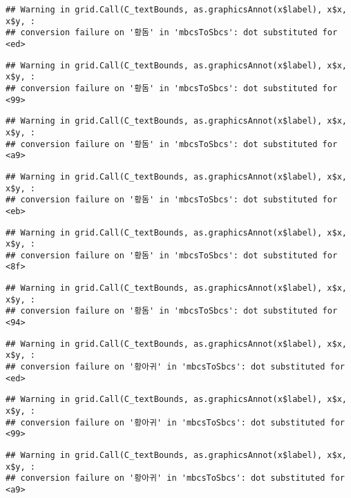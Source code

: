 \documentclass[
]{article}
\begin{document}
\begin{verbatim}
## Warning in grid.Call(C_textBounds, as.graphicsAnnot(x$label), x$x, x$y, :
## conversion failure on '황돔' in 'mbcsToSbcs': dot substituted for <ed>
\end{verbatim}

\begin{verbatim}
## Warning in grid.Call(C_textBounds, as.graphicsAnnot(x$label), x$x, x$y, :
## conversion failure on '황돔' in 'mbcsToSbcs': dot substituted for <99>
\end{verbatim}

\begin{verbatim}
## Warning in grid.Call(C_textBounds, as.graphicsAnnot(x$label), x$x, x$y, :
## conversion failure on '황돔' in 'mbcsToSbcs': dot substituted for <a9>
\end{verbatim}

\begin{verbatim}
## Warning in grid.Call(C_textBounds, as.graphicsAnnot(x$label), x$x, x$y, :
## conversion failure on '황돔' in 'mbcsToSbcs': dot substituted for <eb>
\end{verbatim}

\begin{verbatim}
## Warning in grid.Call(C_textBounds, as.graphicsAnnot(x$label), x$x, x$y, :
## conversion failure on '황돔' in 'mbcsToSbcs': dot substituted for <8f>
\end{verbatim}

\begin{verbatim}
## Warning in grid.Call(C_textBounds, as.graphicsAnnot(x$label), x$x, x$y, :
## conversion failure on '황돔' in 'mbcsToSbcs': dot substituted for <94>
\end{verbatim}

\begin{verbatim}
## Warning in grid.Call(C_textBounds, as.graphicsAnnot(x$label), x$x, x$y, :
## conversion failure on '황아귀' in 'mbcsToSbcs': dot substituted for <ed>
\end{verbatim}

\begin{verbatim}
## Warning in grid.Call(C_textBounds, as.graphicsAnnot(x$label), x$x, x$y, :
## conversion failure on '황아귀' in 'mbcsToSbcs': dot substituted for <99>
\end{verbatim}

\begin{verbatim}
## Warning in grid.Call(C_textBounds, as.graphicsAnnot(x$label), x$x, x$y, :
## conversion failure on '황아귀' in 'mbcsToSbcs': dot substituted for <a9>
\end{verbatim}
\end{document}
